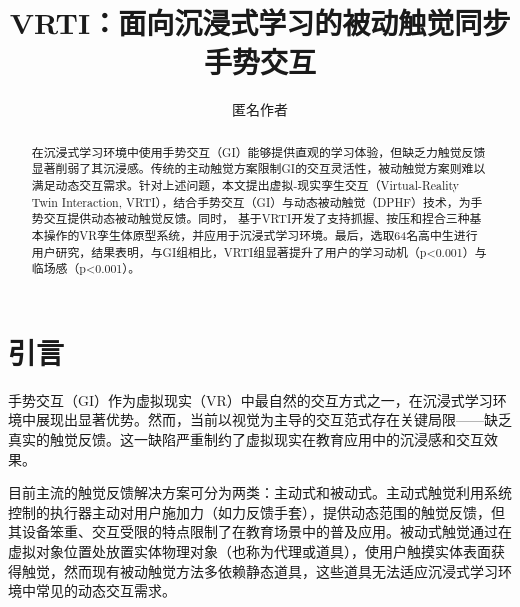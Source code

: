 \documentclass[runningheads]{llncs}
\begin{document}
\title{VRTI：面向沉浸式学习的被动触觉同步手势交互}

 


\author{匿名作者}

\maketitle


\begin{abstract}
在沉浸式学习环境中使用手势交互（GI）能够提供直观的学习体验，但缺乏力触觉反馈显著削弱了其沉浸感。传统的主动触觉方案限制GI的交互灵活性，被动触觉方案则难以满足动态交互需求。针对上述问题，本文提出虚拟-现实孪生交互（Virtual-Reality Twin Interaction, VRTI），结合手势交互（GI）与动态被动触觉（DPHF）技术，为手势交互提供动态被动触觉反馈。同时，
基于VRTI开发了支持抓握、按压和捏合三种基本操作的VR孪生体原型系统，并应用于沉浸式学习环境。最后，选取64名高中生进行用户研究，结果表明，与GI组相比，VRTI组显著提升了用户的学习动机（p<0.001）与临场感（p<0.001）。

\end{abstract}

\section{引言}
手势交互（GI）作为虚拟现实（VR）中最自然的交互方式之一，在沉浸式学习环境中展现出显著优势\cite{fang2024interactive,amaral2024interactive}。然而，当前以视觉为主导的交互范式存在关键局限——缺乏真实的触觉反馈。这一缺陷严重制约了虚拟现实在教育应用中的沉浸感和交互效果。

目前主流的触觉反馈解决方案可分为两类：主动式和被动式。主动式触觉利用系统控制的执行器主动对用户施加力（如力反馈手套），提供动态范围的触觉反馈，但其设备笨重、交互受限的特点限制了在教育场景中的普及应用\cite{bonfert2023challenges,shigeyama2019transcalibur}。被动式触觉通过在虚拟对象位置处放置实体物理对象（也称为代理或道具），使用户触摸实体表面获得触觉\cite{hinckley1994passive}，然而现有被动触觉方法多依赖静态道具\cite{strandholt2020knock,fang2023vr,rettinger2023touching}，这些道具无法适应沉浸式学习环境中常见的动态交互需求。
\end{document}
